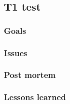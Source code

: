 


\subsection{T1 test}
\label{sec:test:t1}


\subsubsection{Goals}
\label{sec:test:t1:goals}

\subsubsection{Issues}
\label{sec:test:t1:Issues}

\subsubsection{Post mortem}
\label{sec:test:t1:postmortem}

\subsubsection{Lessons learned}
\label{sec:test:t1:lessons}
